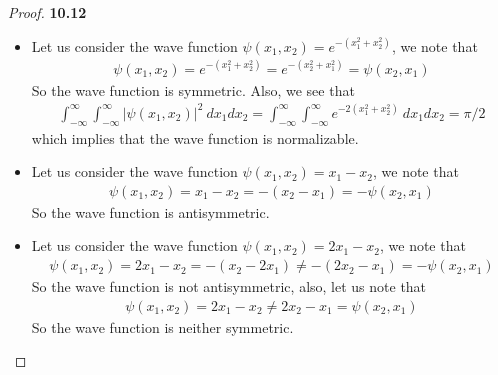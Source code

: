 \documentclass[11pt]{article}
\theoremstyle{definition}
\begin{document}
\cleardoublepage
\begin{proof}{\textbf{10.12}}
\begin{itemize}
\item [(a)] Let us consider the wave function
$\psi(x_1, x_2) = e^{-(x_1^2 + x_2^2)}$, we note that
\begin{align*}
    \psi(x_1, x_2) = e^{-(x_1^2 + x_2^2)} = e^{-(x_2^2 + x_1^2)} = \psi(x_2, x_1)
\end{align*}
So the wave function is symmetric. Also, we see that
\begin{align*}
    \int_{-\infty}^\infty \int_{-\infty}^\infty |\psi(x_1,x_2)|^2 ~dx_1 dx_2 = 
    \int_{-\infty}^\infty \int_{-\infty}^\infty e^{-2(x_1^2 + x_2^2)} ~dx_1 dx_2
    = \pi/2
\end{align*}
which implies that the wave function is normalizable.

\item [(b)] Let us consider the wave function
$\psi(x_1, x_2) = x_1 - x_2$, we note that
\begin{align*}
    \psi(x_1, x_2) = x_1 - x_2 = -(x_2 - x_1) = -\psi(x_2, x_1)
\end{align*}
So the wave function is antisymmetric.

\item [(c)] Let us consider the wave function $\psi(x_1, x_2) = 2x_1 - x_2$,
we note that
\begin{align*}
    \psi(x_1, x_2) = 2x_1 - x_2 = -(x_2 - 2x_1) \neq -(2x_2 - x_1) = -\psi(x_2, x_1)
\end{align*}
So the wave function is not antisymmetric, also, let us note that
\begin{align*}
    \psi(x_1, x_2) = 2x_1 - x_2 \neq 2x_2 - x_1 = \psi(x_2, x_1)
\end{align*}
So the wave function is neither symmetric.
\end{itemize}
\end{proof}
\end{document}
